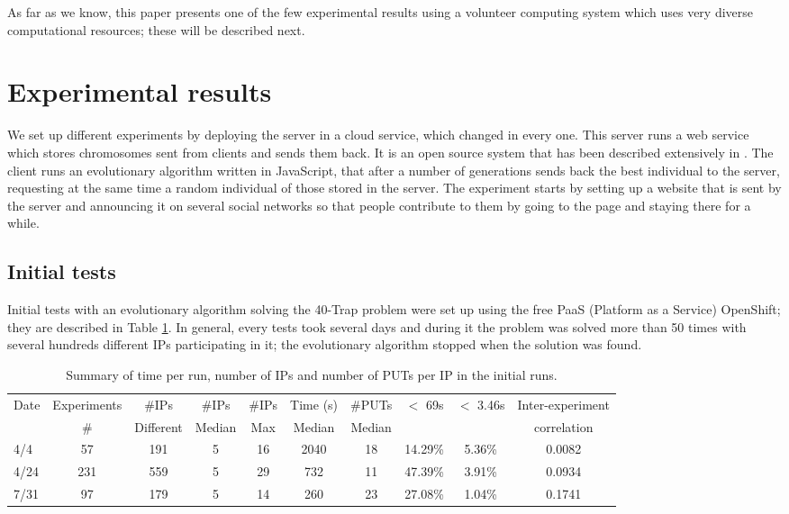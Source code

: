 \documentclass{sig-alternate}
\begin{document}
As far as we know, this paper presents one of the few experimental
results using a volunteer computing system which uses  %
very diverse computational resources; these will be described next.


\section{Experimental results}
\label{sec:exp1}


We set up different experiments by deploying the server in a cloud
service, which changed in every one. This server runs a web service
which stores chromosomes sent from clients and sends them back. It is
an open source system that has been described extensively in
\cite{2016arXiv160101607Manom}. The client runs an evolutionary
algorithm written in JavaScript, that after a number of generations
sends back the best individual to the server, requesting at the same
time a random individual of those stored in the server. The experiment
starts by setting up a website that is sent by the server and announcing it on several social
networks so that people contribute to them by going to the page and
staying there for a while. 

\subsection{Initial tests}

Initial tests with an evolutionary algorithm solving the 40-Trap
problem were set up using the free PaaS (Platform as a
Service) OpenShift; they are described in
Table \ref{tab:summary:os}. In general, every tests took several
days and during it the problem was solved more than 50 times with
several hundreds different IPs participating in it; the
evolutionary algorithm stopped when the solution was found. 
%
\begin{table}
\caption{Summary of time per run, number of IPs and number of PUTs per IP in the initial runs. \label{tab:summary:os}}
\begin{center}
\begin{tabular}{l|ccccccccc}
\hline
Date & Experiments &\#IPs &\#IPs &  \#IPs & Time (s) &  \#PUTs & $<$ 69s & $<$ 3.46s & Inter-experiment\\
     & \# & Different & Median & Max & Median &  Median & & & correlation \\ 
\hline
4/4 & 57 & 191 & 5 & 16 & 2040 & 18 & 14.29\% & 5.36\% & 0.0082 \\
4/24 & 231 & 559 & 5 & 29 & 732 & 11 & 47.39\% & 3.91\% & 0.0934\\
7/31 & 97 & 179 & 5 & 14 & 260 & 23 & 27.08\% & 1.04\%  & 0.1741\\
\hline
\end{tabular}
\end{center}
\end{table}
%
\end{document}
